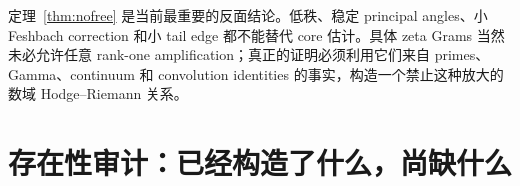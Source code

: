 \documentclass[UTF8,11pt,a4paper]{ctexart}
\theoremstyle{definition}
\theoremstyle{remark}
\newcommand{\1}{\mathbf 1}
\begin{document}
定理~\ref{thm:nofree} 是当前最重要的反面结论。低秩、稳定 principal angles、小 Feshbach correction 和小 tail edge 都不能替代 core 估计。具体 zeta Grams 当然未必允许任意 rank-one amplification；真正的证明必须利用它们来自 primes、Gamma、continuum 和 convolution identities 的事实，构造一个禁止这种放大的数域 Hodge--Riemann 关系。










\section{存在性审计：已经构造了什么，尚缺什么}
\end{document}
